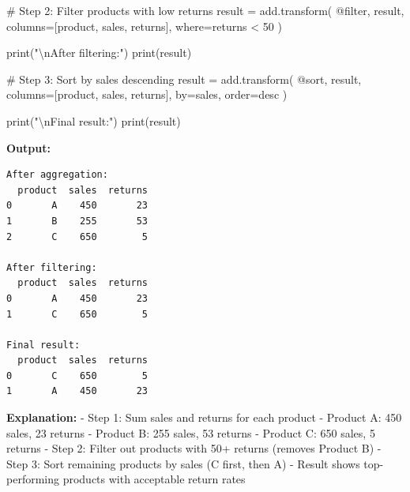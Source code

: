 \documentclass[
  letterpaper,
]{scrbook}
\newenvironment{Shaded}{\begin{snugshade}}{\end{snugshade}}
\newcommand{\BuiltInTok}[1]{\textcolor[rgb]{0.00,0.23,0.31}{#1}}
\newcommand{\CharTok}[1]{\textcolor[rgb]{0.13,0.47,0.30}{#1}}
\newcommand{\CommentTok}[1]{\textcolor[rgb]{0.37,0.37,0.37}{#1}}
\newcommand{\NormalTok}[1]{\textcolor[rgb]{0.00,0.23,0.31}{#1}}
\newcommand{\OperatorTok}[1]{\textcolor[rgb]{0.37,0.37,0.37}{#1}}
\newcommand{\StringTok}[1]{\textcolor[rgb]{0.13,0.47,0.30}{#1}}
\begin{document}
\begin{Shaded}
\begin{Highlighting}[]
\CommentTok{\# Step 2: Filter products with low returns}
\NormalTok{result }\OperatorTok{=}\NormalTok{ add.transform(}
    \StringTok{\textquotesingle{}@filter\textquotesingle{}}\NormalTok{,}
\NormalTok{    result,}
\NormalTok{    columns}\OperatorTok{=}\NormalTok{[}\StringTok{\textquotesingle{}product\textquotesingle{}}\NormalTok{, }\StringTok{\textquotesingle{}sales\textquotesingle{}}\NormalTok{, }\StringTok{\textquotesingle{}returns\textquotesingle{}}\NormalTok{],}
\NormalTok{    where}\OperatorTok{=}\StringTok{\textquotesingle{}returns \textless{} 50\textquotesingle{}}
\NormalTok{)}

\BuiltInTok{print}\NormalTok{(}\StringTok{"}\CharTok{\textbackslash{}n}\StringTok{After filtering:"}\NormalTok{)}
\BuiltInTok{print}\NormalTok{(result)}

\CommentTok{\# Step 3: Sort by sales descending}
\NormalTok{result }\OperatorTok{=}\NormalTok{ add.transform(}
    \StringTok{\textquotesingle{}@sort\textquotesingle{}}\NormalTok{,}
\NormalTok{    result,}
\NormalTok{    columns}\OperatorTok{=}\NormalTok{[}\StringTok{\textquotesingle{}product\textquotesingle{}}\NormalTok{, }\StringTok{\textquotesingle{}sales\textquotesingle{}}\NormalTok{, }\StringTok{\textquotesingle{}returns\textquotesingle{}}\NormalTok{],}
\NormalTok{    by}\OperatorTok{=}\StringTok{\textquotesingle{}sales\textquotesingle{}}\NormalTok{,}
\NormalTok{    order}\OperatorTok{=}\StringTok{\textquotesingle{}desc\textquotesingle{}}
\NormalTok{)}

\BuiltInTok{print}\NormalTok{(}\StringTok{"}\CharTok{\textbackslash{}n}\StringTok{Final result:"}\NormalTok{)}
\BuiltInTok{print}\NormalTok{(result)}
\end{Highlighting}
\end{Shaded}

\textbf{Output:}

\begin{verbatim}
After aggregation:
  product  sales  returns
0       A    450       23
1       B    255       53
2       C    650        5

After filtering:
  product  sales  returns
0       A    450       23
1       C    650        5

Final result:
  product  sales  returns
0       C    650        5
1       A    450       23
\end{verbatim}

\textbf{Explanation:} - Step 1: Sum sales and returns for each product -
Product A: 450 sales, 23 returns - Product B: 255 sales, 53 returns -
Product C: 650 sales, 5 returns - Step 2: Filter out products with 50+
returns (removes Product B) - Step 3: Sort remaining products by sales
(C first, then A) - Result shows top-performing products with acceptable
return rates
\end{document}
